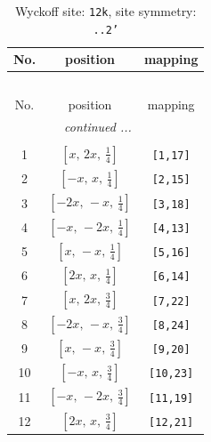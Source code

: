 \documentclass[fleqn,8pt]{jsarticle}
\begin{document}
\begin{longtable}{ccc}
\caption{Wyckoff site: {\tt 12k}, site symmetry: {\tt ..2'}}
 \\
 \hline \hline
No. & position & mapping \\ \hline \endfirsthead

\multicolumn{2}{l}{\tablename\ \thetable{}} \\
 \hline \hline
No. & position & mapping \\ \hline \endhead

 \hline \hline
\multicolumn{2}{r}{\footnotesize\it continued ...} \\ \endfoot

 \hline \hline
\multicolumn{2}{r}{} \\ \endlastfoot

1 & $\left[ x,\, 2 x,\, \frac{1}{4} \right]$ & {\tt [1,17]} \\ \hline
2 & $\left[ - x,\, x,\, \frac{1}{4} \right]$ & {\tt [2,15]} \\ \hline
3 & $\left[ - 2 x,\, - x,\, \frac{1}{4} \right]$ & {\tt [3,18]} \\ \hline
4 & $\left[ - x,\, - 2 x,\, \frac{1}{4} \right]$ & {\tt [4,13]} \\ \hline
5 & $\left[ x,\, - x,\, \frac{1}{4} \right]$ & {\tt [5,16]} \\ \hline
6 & $\left[ 2 x,\, x,\, \frac{1}{4} \right]$ & {\tt [6,14]} \\ \hline
7 & $\left[ x,\, 2 x,\, \frac{3}{4} \right]$ & {\tt [7,22]} \\ \hline
8 & $\left[ - 2 x,\, - x,\, \frac{3}{4} \right]$ & {\tt [8,24]} \\ \hline
9 & $\left[ x,\, - x,\, \frac{3}{4} \right]$ & {\tt [9,20]} \\ \hline
10 & $\left[ - x,\, x,\, \frac{3}{4} \right]$ & {\tt [10,23]} \\ \hline
11 & $\left[ - x,\, - 2 x,\, \frac{3}{4} \right]$ & {\tt [11,19]} \\ \hline
12 & $\left[ 2 x,\, x,\, \frac{3}{4} \right]$ & {\tt [12,21]} \\
\end{longtable}
\renewcommand{\arraystretch}{1.2}
\end{document}
